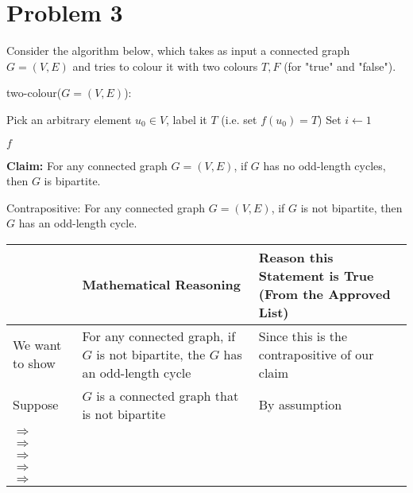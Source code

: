 \documentclass{article}
\begin{document}
\section{Problem 3}

\noindent Consider the algorithm below, which takes as input a connected graph $G=(V,E)$ and tries to colour it with two colours ${T,F}$ (for "true" and "false").\vspace{15pt}



\begin{algorithm}
    \caption{two-colour($G=(V,E)$):}

    \BlankLine
    Pick an arbitrary element $u_0\in V$, label it $T$ (i.e. set $f(u_0)=T$)\;
    Set $i\leftarrow 1$\;

    \BlankLine

    \BlankLine
    \Return $f$\;
\end{algorithm}


\noindent\textbf{Claim:} For any connected graph $G=(V,E)$, if $G$ has no odd-length cycles, then $G$ is bipartite.\vspace{15pt}


Contrapositive: For any connected graph $G=(V,E)$, if $G$ is not bipartite, then $G$ has an odd-length cycle.
\vspace{15pt}

\begin{adjustwidth}{-1.5cm}{}
	\begin{sloppypar}
		\begin{tabular}{|p{1.5cm}|p{6.6cm}|p{5.5cm}|}
		\hline
		& \textbf{Mathematical Reasoning} & \textbf{Reason this Statement is True (From the Approved List)} \\
		\hline
		We want to show & For any connected graph, if $G$ is not bipartite, the $G$ has an odd-length cycle  & Since this is the contrapositive of our claim \\
		\hline
		Suppose & $G$ is a connected graph that is not bipartite & By assumption \\
		\hline
		$\Rightarrow$ & & \\
		\hline
		$\Rightarrow$ & & \\
		\hline
		$\Rightarrow$ & & \\
		\hline
		$\Rightarrow$ & & \\
		\hline
		$\Rightarrow$ & & \\
		\end{tabular}
	\end{sloppypar}
\end{adjustwidth}


\pagebreak
\end{document}
